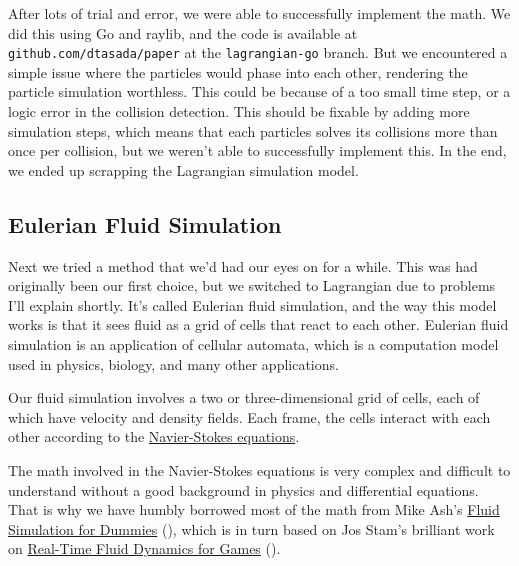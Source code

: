 \documentclass[a4paper,12pt]{article}
\begin{document}
After lots of trial and error, we were able to successfully implement the math.
We did this using Go and raylib, and the code is available at
\verb|github.com/dtasada/paper| at the \verb|lagrangian-go| branch.
But we encountered a simple issue where the particles would phase into each other,
rendering the particle simulation worthless.
This could be because of a too small time step, or a logic error in the collision
detection. This should be fixable by adding more simulation steps, which means
that each particles solves its collisions more than once per collision, but we
weren't able to successfully implement this. In the end, we ended up scrapping
the Lagrangian simulation model.

\subsection{Eulerian Fluid Simulation}
Next we tried a method that we'd had our eyes on for a while. This was had
originally been our first choice, but we switched to Lagrangian due to problems
I'll explain shortly. It's called Eulerian fluid simulation, and the way this
model works is that it sees fluid as a grid of cells that react to each other.
Eulerian fluid simulation is an application of cellular automata, which is a
computation model used in physics, biology, and many other applications.

Our fluid simulation involves a two or three-dimensional grid of cells,
each of which have velocity and density fields.
Each frame, the cells interact with each other according to the
\hyperlink{https://en.wikipedia.org/wiki/Navier\%E2\%80\%93Stokes_equations}{Navier-Stokes equations}.

The math involved in the Navier-Stokes equations is very complex and
difficult to understand without a good background in physics and differential
equations. That is why we have humbly borrowed most of the math from Mike Ash's
\hyperlink{https://mikeash.com/pyblog/fluid-simulation-for-dummies.html}{Fluid Simulation for Dummies}
(\cite{mikeash}), which is in turn based on Jos Stam's brilliant work on
\hyperlink{http://graphics.cs.cmu.edu/nsp/course/15-464/Fall09/papers/StamFluidforGames.pdf}{Real-Time Fluid Dynamics for Games} (\cite{josstam}).

\end{document}
